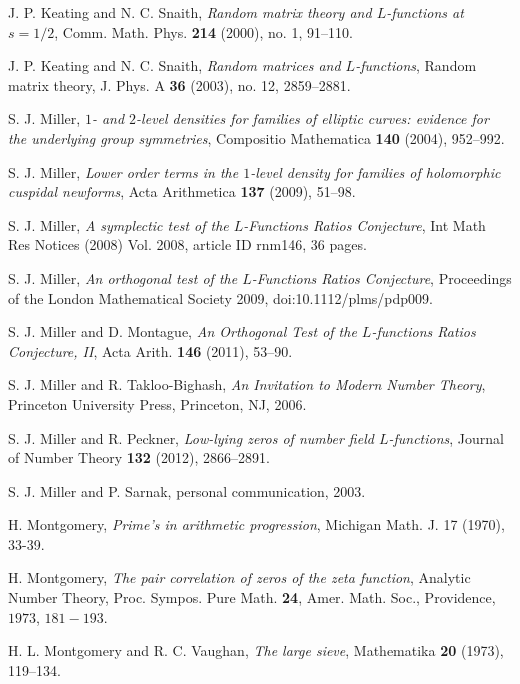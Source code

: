 \documentclass[12pt,reqno]{amsart}
\numberwithin{equation}{section}
\theoremstyle{plain}
\begin{document}
\begin{thebibliography}{GJMMNPPV}
\newblock J. P. Keating and N. C. Snaith, \emph{Random matrix theory and $L$-functions at $s=1/2$},
Comm. Math. Phys.  \textbf{214}  (2000),  no. 1, 91--110.

\newblock J. P. Keating and N. C. Snaith, \emph{Random
matrices and $L$-functions}, Random matrix theory, J. Phys. A
\textbf{36} (2003), no. 12, 2859--2881.

\newblock S. J. Miller, \emph{$1$- and $2$-level densities for families of elliptic
curves: evidence for the underlying group symmetries}, Compositio
Mathematica \textbf{140} (2004), 952--992.

\newblock S. J. Miller, \emph{Lower
order terms in the $1$-level density for families of holomorphic
cuspidal newforms}, Acta Arithmetica \textbf{137} (2009), 51--98.

\newblock S. J. Miller, \emph{A symplectic test of the $L$-Functions Ratios Conjecture}, Int Math Res Notices (2008) Vol. 2008, article ID rnm146, 36 pages. 

\newblock S. J. Miller, \emph{An orthogonal test of the $L$-Functions Ratios Conjecture}, Proceedings of the London Mathematical Society 2009, doi:10.1112/plms/pdp009.

\newblock S. J. Miller and D. Montague, \emph{An Orthogonal Test of the $L$-functions Ratios Conjecture, II}, Acta Arith. \textbf{146} (2011), 53--90.

\newblock S. J. Miller and R. Takloo-Bighash, \emph{An Invitation to Modern Number Theory}, Princeton University Press, Princeton, NJ, 2006.

\newblock S. J. Miller and R. Peckner, \emph{Low-lying zeros of number field $L$-functions}, Journal of Number Theory \textbf{132} (2012), 2866--2891.

\newblock S. J. Miller and P. Sarnak, personal communication, 2003.

\newblock H. Montgomery, \emph{Prime's in arithmetic progression},
Michigan Math. J. 17 (1970), 33-39.

\newblock H. Montgomery, \emph{The pair correlation of zeros of the zeta
function}, Analytic Number Theory, Proc. Sympos. Pure Math.
\textbf{24}, Amer. Math. Soc., Providence, $1973$, $181-193$.

 H. L. Montgomery and R. C. Vaughan, \emph{The large sieve}, Mathematika \textbf{20} (1973), 119--134.


\end{thebibliography}
\end{document}
